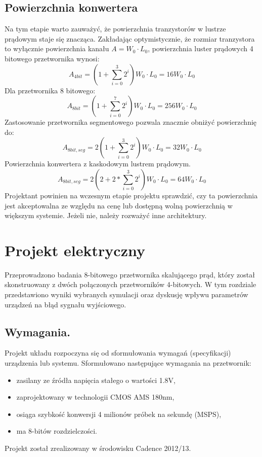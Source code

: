\documentclass[10pt,a4paper,twoside]{report}
\theoremstyle{definition}
\theoremstyle{definition}
\theoremstyle{definition}
\theoremstyle{definition}
\theoremstyle{definition}
\begin{document}
{\section{Powierzchnia konwertera}
{	Na tym etapie warto zauważyć, że powierzchnia tranzystorów w lustrze prądowym staje się znacząca. Zakładając optymistycznie, że rozmiar tranzystora to wyłącznie powierzchnia kanału $A=W_0\cdot L_0$, powierzchnia luster prądowych 4 bitowego przetwornika wynosi:
	\begin{equation}
	A_{4bit} =  \left( 1 + \sum_{i=0}^{3}2^i \right)   W_0 \cdot L_0= 16 W_0 \cdot L_0
	\end{equation}
	Dla przetwornika 8 bitowego:
	\begin{equation}
	A_{8bit} = \left( 1 + \sum_{i=0}^{7}2^i \right)   W_0 \cdot L_0 = 256 W_0 \cdot L_0
	\end{equation}
	Zastosowanie przetwornika segmentowego pozwala znacznie obniżyć powierzchnię do:
	\begin{equation}
	A_{8bit,seg} = 2\left( 1 + \sum_{i=0}^{3}2^i \right)   W_0 \cdot L_0 = 32 W_0 \cdot L_0
	\end{equation}
	Powierzchnia konwertera z kaskodowym lustrem prądowym.
	\begin{equation}
		A_{8bit,seg} = 2\left( 2 + 2*\sum_{i=0}^{3}2^i \right)   W_0 \cdot L_0 = 64 W_0 \cdot L_0
	\end{equation}
	Projektant powinien na wczesnym etapie projektu sprawdzić, czy ta powierzchnia jest akceptowalna ze względu na cenę lub dostępną wolną powierzchnią w większym systemie. Jeżeli nie, należy rozważyć inne architektury. }

	\chapter{Projekt elektryczny}
	{	Przeprowadzono badania 8-bitowego przetwornika skalującego prąd, który został skonstruowany z dwóch połączonych przetworników 4-bitowych. W tym rozdziale przedstawiono wyniki wybranych symulacji oraz dyskusję wpływu parametrów urządzeń na błąd sygnału wyjściowego.}
	
	\section{Wymagania.}
	{	Projekt układu rozpoczyna się od sformułowania wymagań (specyfikacji) urządzenia lub systemu. Sformułowano następujące wymagania na przetwornik:
		\begin{itemize}
			\item zasilany ze źródła napięcia stałego o wartości 1.8V,
			\item zaprojektowany w technologii CMOS AMS 180nm,
			\item osiąga szybkość konwersji 4 milionów próbek na sekundę (MSPS),
			\item ma 8-bitów rozdzielczości.
		\end{itemize} 
	Projekt został zrealizowany w środowisku Cadence 2012/13.}
	
}
\end{document}
